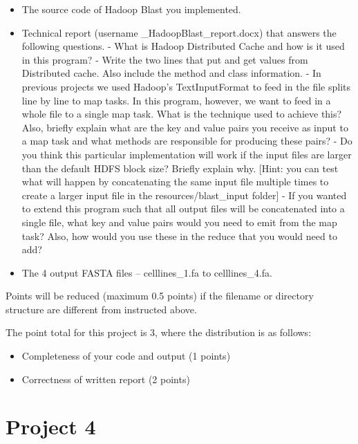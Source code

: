 \begin{itemize}
\tightlist
\item
  The source code of Hadoop Blast you implemented.
\item
  Technical report (username \_HadoopBlast\_report.docx) that answers
  the following questions. - What is Hadoop Distributed Cache and how is
  it used in this program? - Write the two lines that put and get values
  from Distributed cache. Also include the method and class information.
  - In previous projects we used Hadoop's TextInputFormat to feed in the
  file splits line by line to map tasks. In this program, however, we
  want to feed in a whole file to a single map task. What is the
  technique used to achieve this? Also, briefly explain what are the key
  and value pairs you receive as input to a map task and what methods
  are responsible for producing these pairs? - Do you think this
  particular implementation will work if the input files are larger than
  the default HDFS block size? Briefly explain why. [Hint: you can
  test what will happen by concatenating the same input file multiple
  times to create a larger input file in the resources/blast\_input
  folder] - If you wanted to extend this program such that all output
  files will be concatenated into a single file, what key and value
  pairs would you need to emit from the map task? Also, how would you
  use these in the reduce that you would need to add?
\item
  The 4 output FASTA files -- celllines\_1.fa to celllines\_4.fa.
\end{itemize}

Points will be reduced (maximum 0.5 points) if the filename or directory
structure are different from instructed above.

The point total for this project is 3, where the distribution is as
follows:

\begin{itemize}
\tightlist
\item
  Completeness of your code and output (1 points)
\item
  Correctness of written report (2 points)
\end{itemize}



\chapter{Project 4}\label{project-4}

